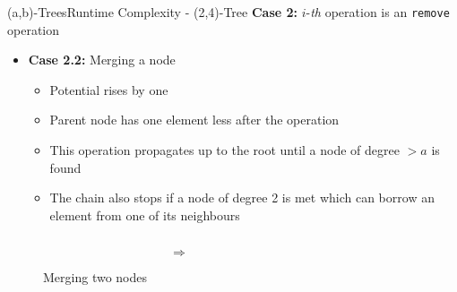\begin{frame}{(a,b)-Trees}{Runtime Complexity - (2,4)-Tree}
  \textbf{Case 2:}
  {\color{Mittel-Blau}$i$}-\textit{th} operation is an
  \texttt{\color{Mittel-Blau}remove} operation
  \begin{itemize}
    \item<2->
      \textbf{Case 2.2:} Merging a node
    \begin{itemize}
      \item<3->
        Potential rises by one
      \item<4->
        Parent node has one element less after the operation
      \item<5->
        This operation propagates up to the root until a node of degree
        {\color{Mittel-Blau}$>a$} is found
      \item<6->
        The chain also stops if a node of {\color{Mittel-Blau}degree 2}
        is met which can borrow an element from one of its neighbours
    \end{itemize}
  \end{itemize}
  \begin{figure}
    \begin{columns}
      \begin{column}{0.35\linewidth}
        \begin{adjustbox}{width=\linewidth}
          
        \end{adjustbox}
      \end{column}
      \begin{column}{0.1\linewidth}
        \begin{center}
          $\Rightarrow$
        \end{center}
      \end{column}
      \begin{column}{0.35\linewidth}
        \begin{adjustbox}{width=0.85\linewidth}
          
        \end{adjustbox}
      \end{column}
    \end{columns}
    \caption{Merging two nodes}
    \label{fig:a_b_tree:merge_potential}
  \end{figure}
\end{frame}


